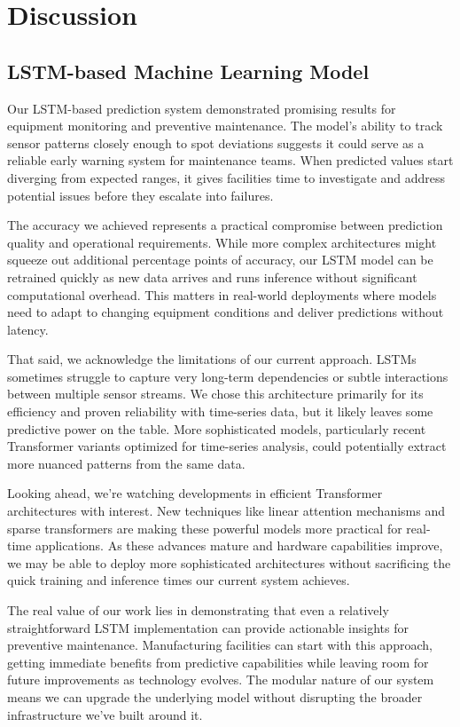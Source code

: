 \chapter{Discussion}
\label{chap:discussion}
\setlength{\parskip}{1em}

\section{LSTM-based Machine Learning Model}
Our LSTM-based prediction system demonstrated promising results for equipment monitoring and preventive maintenance. The model's ability to track sensor patterns closely enough to spot deviations suggests it could serve as a reliable early warning system for maintenance teams. When predicted values start diverging from expected ranges, it gives facilities time to investigate and address potential issues before they escalate into failures.

The accuracy we achieved represents a practical compromise between prediction quality and operational requirements. While more complex architectures might squeeze out additional percentage points of accuracy, our LSTM model can be retrained quickly as new data arrives and runs inference without significant computational overhead. This matters in real-world deployments where models need to adapt to changing equipment conditions and deliver predictions without latency.

That said, we acknowledge the limitations of our current approach. LSTMs \cite{waqas-2024-critical} sometimes struggle to capture very long-term dependencies or subtle interactions between multiple sensor streams. We chose this architecture primarily for its efficiency and proven reliability with time-series data, but it likely leaves some predictive power on the table. More sophisticated models, particularly recent Transformer variants optimized for time-series analysis, could potentially extract more nuanced patterns from the same data.

Looking ahead, we're watching developments in efficient Transformer \cite{ashish2017attention} architectures with interest. New techniques like linear attention mechanisms and sparse transformers are making these powerful models more practical for real-time applications. As these advances mature and hardware capabilities improve, we may be able to deploy more sophisticated architectures without sacrificing the quick training and inference times our current system achieves.

The real value of our work lies in demonstrating that even a relatively straightforward LSTM implementation can provide actionable insights for preventive maintenance. Manufacturing facilities can start with this approach, getting immediate benefits from predictive capabilities while leaving room for future improvements as technology evolves. The modular nature of our system means we can upgrade the underlying model without disrupting the broader infrastructure we've built around it.

